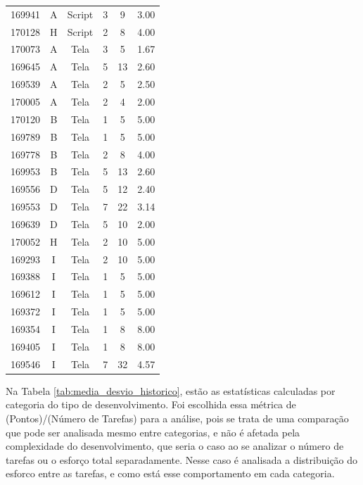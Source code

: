 \begin{longtable}{cccccc}
		169941 & A & Script & 3 & 9 & 3.00 \\
		170128 & H & Script & 2 & 8 & 4.00 \\
		170073 & A & Tela & 3 & 5 & 1.67 \\
		169645 & A & Tela & 5 & 13 & 2.60 \\
		169539 & A & Tela & 2 & 5 & 2.50 \\
		170005 & A & Tela & 2 & 4 & 2.00 \\
		170120 & B & Tela & 1 & 5 & 5.00 \\
		169789 & B & Tela & 1 & 5 & 5.00 \\
		169778 & B & Tela & 2 & 8 & 4.00 \\
		169953 & B & Tela & 5 & 13 & 2.60 \\
		169556 & D & Tela & 5 & 12 & 2.40 \\
		169553 & D & Tela & 7 & 22 & 3.14 \\
		169639 & D & Tela & 5 & 10 & 2.00 \\
		170052 & H & Tela & 2 & 10 & 5.00 \\
		169293 & I & Tela & 2 & 10 & 5.00 \\
		169388 & I & Tela & 1 & 5 & 5.00 \\
		169612 & I & Tela & 1 & 5 & 5.00 \\
		169372 & I & Tela & 1 & 5 & 5.00 \\
		169354 & I & Tela & 1 & 8 & 8.00 \\
		169405 & I & Tela & 1 & 8 & 8.00 \\
		169546 & I & Tela & 7 & 32 & 4.57 \\
	\end{longtable}
	
	Na Tabela \ref{tab:media_desvio_historico}, estão as estatísticas calculadas por categoria do tipo de desenvolvimento. Foi escolhida essa métrica de (Pontos)/(Número de Tarefas) para
	a análise, pois se trata de uma comparação que pode ser analisada mesmo entre categorias, e não é afetada pela complexidade do desenvolvimento, que seria o caso ao se analizar o número de tarefas ou
	o esforço total separadamente. Nesse caso é analisada a distribuição do esforco entre as tarefas, e como está esse comportamento em cada categoria.

